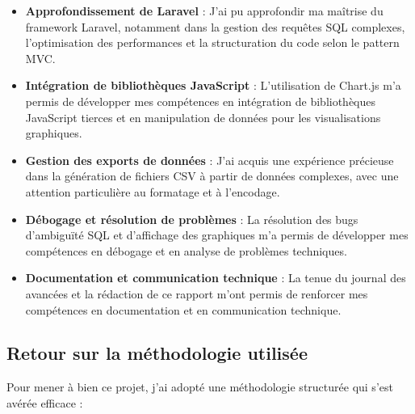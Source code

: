 \documentclass[a4paper,12pt]{report}
\begin{document}
  \begin{itemize}
    \item \textbf{Approfondissement de Laravel} : J'ai pu approfondir ma maîtrise du framework Laravel, notamment dans la gestion des requêtes SQL complexes, l'optimisation des performances et la structuration du code selon le pattern MVC.
    
    \item \textbf{Intégration de bibliothèques JavaScript} : L'utilisation de Chart.js m'a permis de développer mes compétences en intégration de bibliothèques JavaScript tierces et en manipulation de données pour les visualisations graphiques.
    
    \item \textbf{Gestion des exports de données} : J'ai acquis une expérience précieuse dans la génération de fichiers CSV à partir de données complexes, avec une attention particulière au formatage et à l'encodage.
    
    \item \textbf{Débogage et résolution de problèmes} : La résolution des bugs d'ambiguïté SQL et d'affichage des graphiques m'a permis de développer mes compétences en débogage et en analyse de problèmes techniques.
    
    \item \textbf{Documentation et communication technique} : La tenue du journal des avancées et la rédaction de ce rapport m'ont permis de renforcer mes compétences en documentation et en communication technique.
  \end{itemize}

  \subsection{Retour sur la méthodologie utilisée}
  Pour mener à bien ce projet, j'ai adopté une méthodologie structurée qui s'est avérée efficace :
  
\end{document}
